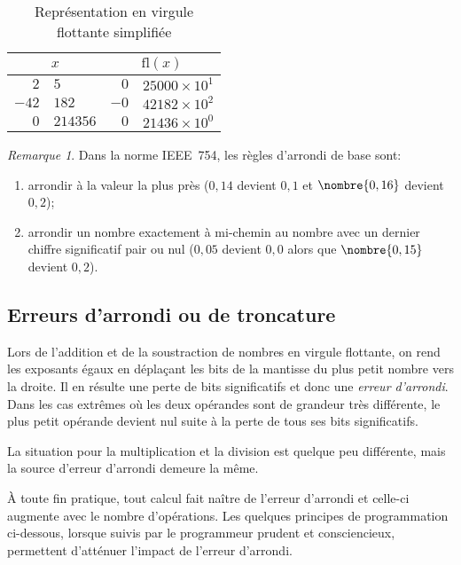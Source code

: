 \documentclass[letterpaper,11pt]{memoir}
\theoremstyle{plain}
\theoremstyle{definition}
\theoremstyle{remark}
\newtheorem*{remarque}{Remarque}
\newenvironment{rem}{\begin{remarque} \mbox{}}{\end{remarque}}
\newcommand{\fl}{\mathrm{fl}}
\begin{document}
\begin{table}
  \caption{Représentation en virgule flottante simplifiée}
  \label{tab:arithmetic:simplified}
  \centering
  \begin{tabular}{r@{,}lr@{,}l}
    \toprule
    \multicolumn{2}{c}{$x$} &
    \multicolumn{2}{c}{$\fl(x)$} \\
    \midrule
    $2$&$5$       & $0$&$25000 \times 10^1$ \\
    $-42$&$182$  & $-0$&$42182 \times 10^2$ \\
    $0$&$214356$ & $0$&$21436 \times 10^0$ \\
    \bottomrule
  \end{tabular}
\end{table}

\begin{rem}
  Dans la norme IEEE~754, les règles d'arrondi de base sont:
  \begin{enumerate}
  \item arrondir à la valeur la plus près ($0,14$ devient $0,1$ et
    $\nombre{0,16}$ devient $0,2$);
  \item arrondir un nombre exactement à mi-chemin au nombre avec un
    dernier chiffre significatif pair ou nul ($0,05$ devient $0,0$
    alors que $\nombre{0,15}$ devient $0,2$).
  \end{enumerate}
\end{rem}


\subsection{Erreurs d'arrondi ou de troncature}
\label{sec:ordinateurs:arithmetique:erreurs}

Lors de l'addition et de la soustraction de nombres en virgule
flottante, on rend les exposants égaux en déplaçant les bits de la
mantisse du plus petit nombre vers la droite. Il en résulte une perte
de bits significatifs et donc une \emph{erreur d'arrondi}. Dans les
cas extrêmes où les deux opérandes sont de grandeur très différente,
le plus petit opérande devient nul suite à la perte de tous ses bits
significatifs.

La situation pour la multiplication et la division est quelque peu
différente, mais la source d'erreur d'arrondi demeure la même.

À toute fin pratique, tout calcul fait naître de l'erreur d'arrondi et
celle-ci augmente avec le nombre d'opérations. Les quelques principes
de programmation ci-dessous, lorsque suivis par le programmeur prudent
et consciencieux, permettent d'atténuer l'impact de l'erreur
d'arrondi.
\end{document}
